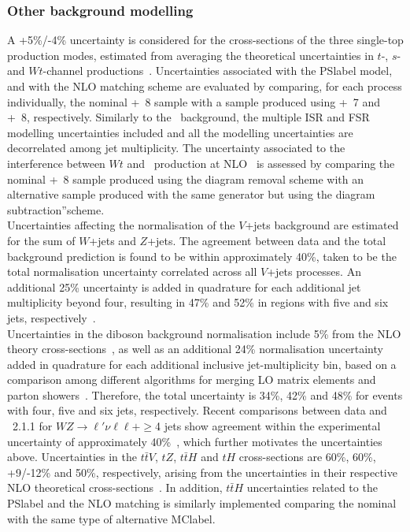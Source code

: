 \subsubsection{Other background modelling}

A +5\%/-4\% uncertainty is considered for the cross-sections of the three single-top production modes, estimated from averaging the theoretical uncertainties in $t$-, $s$- and $Wt$-channel productions~\cite{Kidonakis_2010,Kidonakis_2011}. Uncertainties associated with the \acrshort{PSlabel} model, and with the NLO matching scheme are evaluated by comparing, for each process individually, the nominal \POWHEGBOX+\PYTHIA~8 sample with a sample produced using \POWHEGBOX+\HERWIG~7 and \MGMCatNLO+\PYTHIA~8, respectively. Similarly to the \ttbar\ background, the multiple ISR and FSR modelling uncertainties included and all the modelling uncertainties are decorrelated among jet multiplicity. The uncertainty associated to the interference between $Wt$ and \ttbar\ production at NLO~\cite{Frixione_2008} is assessed by comparing the nominal \POWHEGBOX+\PYTHIA~8 sample produced using the diagram removal scheme with an alternative sample produced with the same generator but using the diagram subtraction”scheme.\\

Uncertainties affecting the normalisation of the $V$+jets background are estimated for the sum of $W$+jets and $Z$+jets. The agreement between data and the total background prediction is found to be within approximately 40\%, taken to be the total normalisation uncertainty correlated across all $V$+jets processes. An additional 25\% uncertainty is added in quadrature for each additional jet multiplicity beyond four, resulting in 47\% and 52\% in regions with five and six jets, respectively~\cite{0706.2569}.\\

Uncertainties in the diboson background normalisation include 5\% from the NLO theory cross-sections~\cite{hep-ph/9905386}, as well as an additional 24\% normalisation uncertainty added in quadrature for each additional inclusive jet-multiplicity bin, based on a comparison among different algorithms for merging LO matrix elements and parton showers~\cite{0706.2569}. Therefore, the total uncertainty is 34\%, 42\% and 48\% for events with four, five and six jets, respectively. Recent comparisons between data and \SHERPA~2.1.1 for $WZ\to\ell'\nu\ell\ell+\geq$4 jets show agreement within the experimental uncertainty of approximately 40\%~\cite{WZbosommeasure}, which further motivates the uncertainties above. Uncertainties in the $t\bar{t}V$, $tZ$, $t\bar{t}H$ and $tH$ cross-sections are 60\%, 60\%, +9/-12\% and 50\%, respectively, arising from the uncertainties in their respective NLO theoretical cross-sections~\cite{CYRM-2017-002,ttVmeasurement}. In addition, $t\bar{t}H$ uncertainties related to the \acrshort{PSlabel} and the NLO matching is similarly implemented comparing the nominal with the same type of alternative \acrshort{MClabel}.